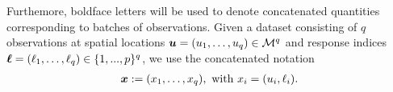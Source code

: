 \documentclass[aoas]{imsart}
\begin{document}
% 
%
%
Furthemore, boldface letters will be used to denote concatenated quantities corresponding to batches of observations.
Given a dataset consisting of  $q$ observations at spatial locations $\bm{u}=(u_1,\dots,u_q) \in \mathcal{M}^q$ and response indices $\bm{\ell}=(\ell_1,\dots, \ell_q)\in \lbrace 1, ..., p\rbrace^q$, %
we use the concatenated notation
\begin{align*}
\bm{x}:=%
(x_1,\dots, x_q),~\text{with }x_i=(\spatloc_i,\ell_i).
\end{align*}
\end{document}
